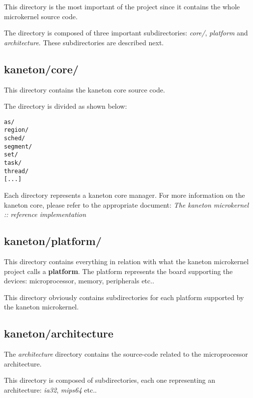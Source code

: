 This directory is the most important of the project since it contains
the whole microkernel source code.

The directory is composed of three important subdirectories: \textit{core/},
\textit{platform} and \textit{architecture}. These subdirectories are described
next.


\subsection*{kaneton/core/}

This directory contains the kaneton core source code.

The directory is divided as shown below:

\begin{verbatim}
as/
region/
sched/
segment/
set/
task/
thread/
[...]
\end{verbatim}

Each directory represents a kaneton core manager. For more information on
the kaneton core, please refer to the appropriate document:
\textit{The kaneton microkernel :: reference implementation}


\subsection*{kaneton/platform/}

This directory contains everything in relation with what the kaneton
microkernel project calls a \textbf{platform}. The platform represents the
board supporting the devices: microprocessor, memory, peripherals etc..

This directory obviously contains subdirectories for each platform
supported by the kaneton microkernel.


\subsection*{kaneton/architecture}

The \textit{architecture} directory contains the source-code related to
the microprocessor architecture.

This directory is composed of subdirectories, each one representing an
architecture: \textit{ia32}, \textit{mips64} etc..


